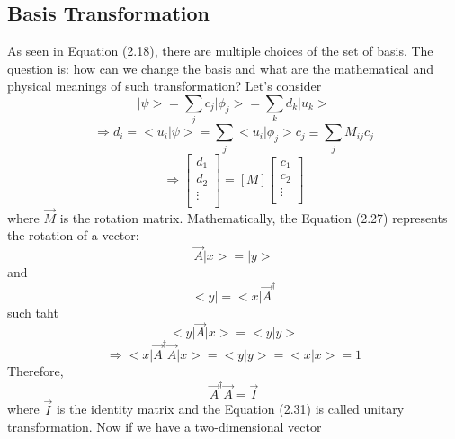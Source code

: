 \subsection{Basis Transformation}
As seen in Equation (2.18), there are multiple choices of the set of basis. The question is: how can we change the basis and what are the mathematical and physical meanings of such transformation? Let's consider \begin{equation}
    \big|\psi\big>=\sum_{j}{c_{j}\big|\phi_{j}\big>}=\sum_{k}{d_{k}\big|u_{k}\big>}
\end{equation} \begin{equation}
    \Rightarrow d_{i} = \big<u_{i}\big|\psi\big> = \sum_{j}{\big<u_{i}\big|\phi_{j}\big>c_{j}} \equiv \sum_{j}{M_{ij}c_{j}}
\end{equation} \begin{equation}
    \Rightarrow \left[\begin{matrix}
    d_{1} \\
    d_{2} \\
    \vdots \\
    \end{matrix}
    \right] = \left[M\right]\left[\begin{matrix}
    c_{1} \\
    c_{2} \\
    \vdots \\
    \end{matrix}
    \right]
\end{equation} where $\vec{M}$ is the rotation matrix. Mathematically, the Equation (2.27) represents the rotation of a vector: \begin{equation}
    \vec{A}\big|x\big> = \big|y\big>
\end{equation} and \begin{equation}
    \big<y\big| = \big<x\big|\vec{A}^{\dagger}
\end{equation} such taht \begin{equation}
    \big<y\big|\vec{A}\big|x\big> = \big<y\big|y\big> \nonumber
\end{equation} \begin{equation}
    \Rightarrow \big<x\big|\vec{A}^{\dagger}\vec{A}\big|x\big> = \big<y\big|y\big> = \big<x\big|x\big> = 1
\end{equation} Therefore, \begin{equation}
    \vec{A}^{\dagger}\vec{A} = \vec{I}
\end{equation} where $\vec{I}$ is the identity matrix and the Equation (2.31) is called unitary transformation. Now if we have a two-dimensional vector \begin{equation}

\end{equation}
